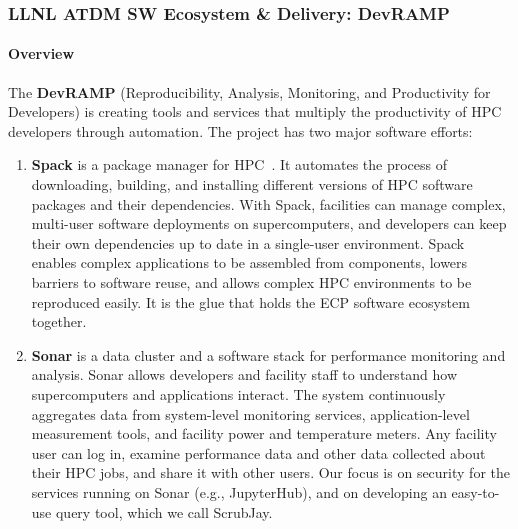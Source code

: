 \subsubsection{ LLNL ATDM SW Ecosystem \& Delivery: DevRAMP}

\paragraph{Overview}
The {\bf DevRAMP} (Reproducibility, Analysis, Monitoring, and Productivity
for Developers) is creating tools and services that multiply the
productivity of HPC developers through automation. The project has two
major software efforts:

\begin{enumerate}
    \item {\bf Spack} is a package manager for
    HPC~\cite{melara+:cug17,gamblin+:sc17-spack-tutorial,gamblin+:sc16-spack-tutorial,gamblin+:sc15,gamblin+:llnl-spack-tutorial-17,gamblin+:ecp18-spack-tutorial,gamblin:pp18-spack,gamblin:hpckp17,gamblin:fosdem18-compilers,gamblin:fosdem18-binary,gamblin:ecp18-spack-sotu,gamblin:eb-user-meeting18,becker+:hust16}. It
    automates the process of downloading, building, and installing
    different versions of HPC software packages and their dependencies.
    With Spack, facilities can manage complex, multi-user software
    deployments on supercomputers, and developers can keep their own
    dependencies up to date in a single-user environment. Spack enables
    complex applications to be assembled from components, lowers barriers
    to software reuse, and allows complex HPC environments to be
    reproduced easily. It is the glue that holds the ECP software
    ecosystem together.

    \item {\bf Sonar} is a data cluster and a software stack for
    performance monitoring and analysis. Sonar allows developers and
    facility staff to understand how supercomputers and applications
    interact. The system continuously aggregates data from system-level
    monitoring services, application-level measurement tools, and
    facility power and temperature meters.  Any facility user can log in,
    examine performance data and other data collected about their HPC
    jobs, and share it with other users. Our focus is on security for the
    services running on Sonar (e.g., JupyterHub), and on developing an
    easy-to-use query tool, which we call ScrubJay.
\end{enumerate}


